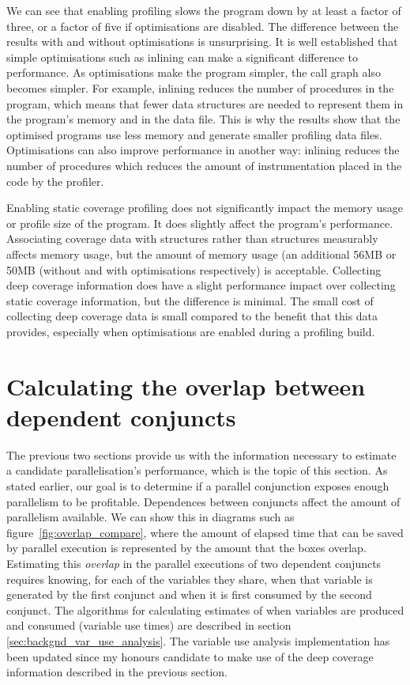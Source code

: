 
We can see that enabling profiling slows the program down by at least a
factor of three,
or a factor of five if optimisations are disabled.
The difference between the results with and without optimisations is
unsurprising.
It is well established that simple optimisations such as inlining can make a
significant difference to performance.
As optimisations make the program simpler, the call graph also becomes
simpler.
For example, inlining reduces the number of procedures in the program,
which means that fewer data structures are needed to represent them in the
program's memory and in the data file.
This is why the results show that the optimised programs use less memory
and generate smaller profiling data files.
Optimisations can also improve performance in another way:
inlining reduces the number of procedures which reduces the amount of
instrumentation placed in the code by the profiler.

Enabling static coverage profiling does not significantly impact the memory
usage or profile size of the program.
It does slightly affect the program's performance.
Associating coverage data with \PD structures rather than \PS structures
measurably affects memory usage,
but the amount of memory usage (an additional 56MB or 50MB
(without and with optimisations respectively)
is acceptable.
Collecting deep coverage information does have a slight performance impact over
collecting static coverage information,
but the difference is minimal.
The small cost of collecting deep coverage data is small compared to the
benefit that this data provides,
especially when optimisations are enabled during a profiling build.


\section{Calculating the overlap between dependent conjuncts}
\label{sec:overlap_overlap_alg}


The previous two sections provide us with the information necessary to
estimate a candidate parallelisation's performance,
which is the topic of this section.
As stated earlier,
our goal is to determine if a parallel conjunction exposes enough
parallelism to be profitable.
Dependences between conjuncts affect the amount of parallelism
available.
We can show this in
diagrams such as
figure~\ref{fig:overlap_compare},
where the amount of elapsed time that can be saved by parallel execution is
represented by the amount that the boxes overlap.
Estimating this \emph{overlap}
in the parallel executions of two dependent conjuncts
requires knowing, for each of the variables they share,
when that variable is generated by the first conjunct and
when it is first consumed by the second conjunct.
The algorithms for calculating estimates of when variables are produced and
consumed
(variable use times)
are described in section \ref{sec:backgnd_var_use_analysis}.
The variable use analysis implementation has been updated since my honours
candidate to make use of the deep coverage information described in the
previous section.


